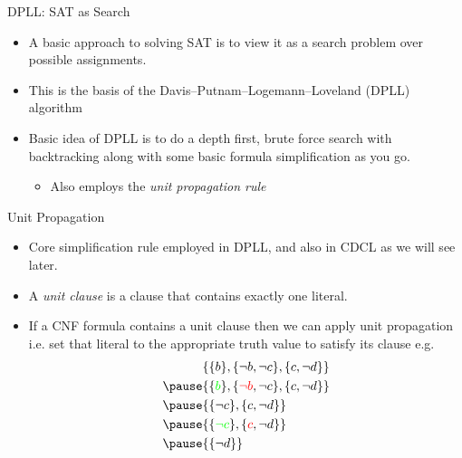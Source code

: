 \documentclass{beamer}
\begin{document}
\begin{frame}{DPLL: SAT as Search}
    \begin{itemize}
        \item A basic approach to solving SAT is to view it as a search problem over possible assignments.
        \item This is the basis of the Davis–Putnam–Logemann–Loveland (DPLL) algorithm \cite{dpll1961}
        \item Basic idea of DPLL is to do a depth first, brute force search with backtracking along with some basic formula simplification as you go.
        \begin{itemize}
            \item Also employs the \textit{unit propagation rule}
        \end{itemize}
    \end{itemize}
\end{frame}

\begin{frame}{Unit Propagation}
    \begin{itemize}
        \item Core simplification rule employed in DPLL, and also in CDCL as we will see later.
        \item A \textit{unit clause} is a clause that contains exactly one literal.
        \item If a CNF formula contains a unit clause then we can apply unit propagation i.e. set that literal to the appropriate truth value to satisfy its clause e.g.
        \begin{align*}
            &\{\{b\}, \{\neg b, \neg c\}, \{c, \neg d\}\}\\
            \pause
            &\{\{\green{b}\}, \{\red{\neg b}, \neg c\}, \{c, \neg d\}\}\\
            \pause
            &\{\{\neg c\}, \{c, \neg d\}\} \\
            \pause
            &\{\{\green{\neg c}\}, \{\red{c}, \neg d\}\}\\
            \pause
            &\{\{\neg d\}\}
        \end{align*}
    \end{itemize}
\end{frame}
\end{document}
